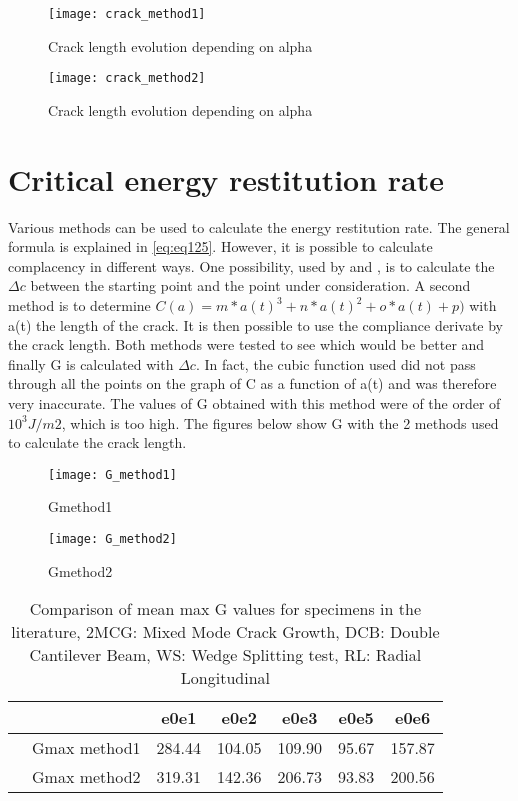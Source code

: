 \begin{figure}[htp]
	\centering
	\texttt{[image: crack\_method1]}
	\caption{Crack length evolution depending on alpha}
	\label{fig:crack_method1}
\end{figure}

\begin{figure}[htp]
	\centering
	\texttt{[image: crack\_method2]}
	\caption{Crack length evolution depending on alpha}
	\label{fig:crack_method2}
\end{figure}

\section{Critical energy restitution rate}

Various methods can be used to calculate the energy restitution rate. The general formula is explained in \ref{eq:eq125}. However, it is possible to calculate complacency in different ways. One possibility, used by \cite{Odounga2018phd} and \cite{MoutouPitti2008}, is to calculate the $\Delta c$ between the starting point and the point under consideration. A second method is to determine $C(a)=m*a(t)^3+n*a(t)^2+o*a(t)+p)$ with a(t) the length of the crack.  It is then possible to use the compliance derivate by the crack length. Both methods were tested to see which would be better and finally G is calculated with $\Delta c$. In fact, the cubic function used did not pass through all the points on the graph of C as a function of a(t) and was therefore very inaccurate. The values of G obtained with this method were of the order of $10^3 J/m2$, which is too high.
The figures below show G with the 2 methods used to calculate the crack length.

\begin{figure}[htp]
	\centering
	\texttt{[image: G\_method1]}
	\caption{Gmethod1}
	\label{fig:G_method1}
\end{figure}

\begin{figure}[htp]
	\centering
	\texttt{[image: G\_method2]}
	\caption{Gmethod2}
	\label{fig:G_method2}
\end{figure}

\begin{table} \centering
	\begin{tabular}{ccccccc}
		\toprule %
		&  & e0e1 & e0e2 & e0e3 & e0e5 & e0e6\\\midrule
		& Gmax method1 & 284.44 & 104.05 & 109.90 & 95.67 & 157.87 \\\midrule
		& Gmax method2 & 319.31 & 142.36 & 206.73 & 93.83 & 200.56 \\\midrule
	\end{tabular}
	\caption{Comparison of mean max G values for specimens in the literature, 2MCG: Mixed Mode Crack Growth, DCB: Double Cantilever Beam, WS: Wedge Splitting test, RL: Radial Longitudinal}
	\label{fig:fig37}
\end{table}

